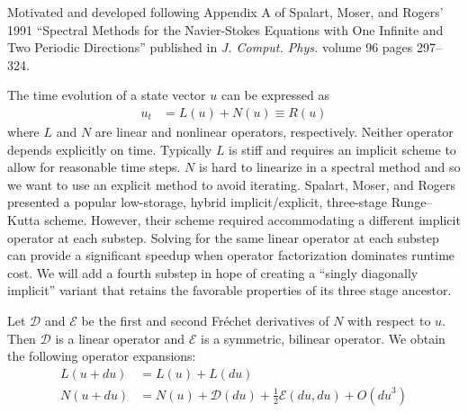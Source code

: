 \documentclass[letterpaper,11pt]{amsart}
\newcommand{\order}[2]{\ensuremath{O\!\left( {#1}^{#2} \right)}}
\begin{document}
Motivated and developed following Appendix A of Spalart, Moser, and
Rogers' 1991 ``Spectral Methods for the Navier-Stokes Equations
with One Infinite and Two Periodic Directions'' published in
\emph{J. Comput. Phys.} volume 96 pages 297--324.

The time evolution of a state vector $u$ can be expressed as
\begin{align}
  u_{t}
  &=
  L(u)
  +
  N(u)
  \equiv
  R(u)
\end{align}
where $L$ and $N$ are linear and nonlinear operators, respectively.  Neither
operator depends explicitly on time.  Typically $L$ is stiff and requires an
implicit scheme to allow for reasonable time steps.  $N$ is hard to linearize
in a spectral method and so we want to use an explicit method to avoid
iterating.  Spalart, Moser, and Rogers presented a popular low-storage, hybrid
implicit/explicit, three-stage Runge--Kutta scheme.  However, their scheme
required accommodating  a different implicit operator at each substep.  Solving
for the same linear operator at each substep can provide a significant speedup
when operator factorization dominates runtime cost.  We will add a fourth
substep in hope of creating a ``singly diagonally implicit'' variant that
retains the favorable properties of its three stage ancestor.

Let $\mathcal{D}$ and $\mathcal{E}$ be the first and second
Fr\'echet derivatives of $N$ with respect to $u$.  Then
$\mathcal{D}$ is a linear operator and $\mathcal{E}$ is a symmetric,
bilinear operator.  We obtain the following operator expansions:
\begin{subequations}
\begin{align}
  L(u+du)
  &=
  L(u)
  +
  L(du)
\\
  N(u+du)
  &=
  N(u)
  +
  \mathcal{D}(du)
  +
  \frac{1}{2}\mathcal{E}(du,du)
  +
  \order{du}{3}
\end{align}
\end{subequations}
\end{document}
